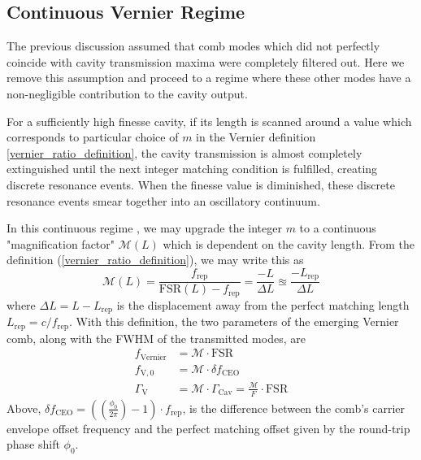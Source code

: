 \documentclass[8pt,a4paper]{report}
\begin{document}
	
	
	\subsection{Continuous Vernier Regime}
	The previous discussion assumed that comb modes which did not perfectly coincide with cavity transmission maxima were completely filtered out. Here we remove this assumption and proceed to a regime where these other modes have a non-negligible contribution to the cavity output.
	
	For a sufficiently high finesse cavity, if its length is scanned around a value which corresponds to particular choice of $m$ in the Vernier definition \ref{vernier_ratio_definition}, the cavity transmission is almost completely extinguished until the next integer matching condition is fulfilled, creating discrete resonance events. When the finesse value is diminished, these discrete resonance events smear together into an oscillatory continuum.
	
	In this continuous regime \cite{vernier_continuous_filtering}, we may upgrade the integer $m$ to a continuous "magnification factor" $\mathcal{M}(L)$ which is dependent on the cavity length. From the definition (\ref{vernier_ratio_definition}), we may write this as
	\begin{equation}
		\mathcal{M}(L) = \frac{f_\mathrm{rep}}{\mathrm{FSR}(L) - f_\mathrm{rep}} = \frac{-L}{\Delta L } \approxeq \frac{-L_\mathrm{rep}}{\Delta L}
	\end{equation}
	where $\Delta L = L - L_\mathrm{rep}$ is the displacement away from the perfect matching length $L_\mathrm{rep} = c/f_\mathrm{rep}$. With this definition, the two parameters of the emerging Vernier comb, along with the FWHM of the transmitted modes, are \cite{vernier_continuous_filtering}
	\begin{align}
		f_\mathrm{Vernier} &= \mathcal{M}\cdot \mathrm{FSR} \\
		f_\mathrm{V, 0} &= \mathcal{M} \cdot \delta f_\mathrm{CEO}\\
		\Gamma_\mathrm{V} &= \mathcal{M}\cdot \Gamma_\mathrm{Cav} = \frac{\mathcal{M}}{F} \cdot \mathrm{FSR}
	\end{align}
	Above, $\delta f_\mathrm{CEO} = ((\frac{\phi_0}{2\pi}) - 1)\cdot f_\text{rep}$, is the difference between the comb's carrier envelope offset frequency and the perfect matching offset given by the round-trip phase shift $\phi_0$.
	
\end{document}
